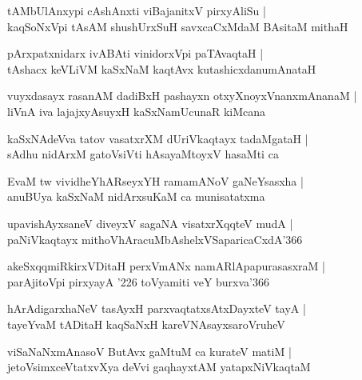\documentclass[twoside,12pt,openright]{book}
\newcounter{shloka}[chapter]
\begin{document}
\begin{shloka}%
tAMbUlAnxypi cAshAnxti viBajanitxV pirxyAliSu |\\
kaqSoNxVpi tAsAM shushUrxSuH savxcaCxMdaM BAsitaM mithaH 
\end{shloka}

\begin{shloka}%
pArxpatxnidarx ivABAti vinidorxVpi paTAvaqtaH |\\
tAshacx keVLiVM kaSxNaM kaqtAvx kutashicxdanumAnataH 
\end{shloka}

\begin{shloka}%
vuyxdasayx rasanAM dadiBxH pashayxn otxyXnoyxVnanxmAnanaM |\\
liVnA iva lajajxyAsuyxH kaSxNamUcunaR kiMcana 
\end{shloka}

\begin{shloka}%
kaSxNAdeVva tatov vasatxrXM dUriVkaqtayx tadaMgataH |\\
sAdhu nidArxM gatoVsiVti hAsayaMtoyxV hasaMti ca 
\end{shloka}

\begin{shloka}%
EvaM tw vividheYhARseyxYH ramamANoV gaNeYsasxha |\\
anuBUya kaSxNaM nidArxsuKaM ca munisatatxma 
\end{shloka}

\begin{shloka}%
upavishAyxsaneV diveyxV sagaNA visatxrXqqteV mudA |\\
paNiVkaqtayx mithoVhAracuMbAshelxVSaparicaCxdA\char'366
\end{shloka}

\begin{shloka}%
akeSxqqmiRkirxVDitaH  perxVmANx namARlApapurasasxraM |\\
parAjitoVpi pirxyayA \char'226 toVyamiti veY burxva\char'366
\end{shloka}

\begin{shloka}%
hArAdigarxhaNeV tasAyxH parxvaqtatxsAtxDayxteV tayA |\\
tayeYvaM tADitaH kaqSaNxH kareVNAsayxsaroVruheV 
\end{shloka}

\begin{shloka}%
viSaNaNxmAnasoV ButAvx gaMtuM ca kurateV matiM |\\
jetoVsimxceVtatxvXya deVvi gaqhayxtAM yatapxNiVkaqtaM 
\end{shloka}
\end{document}
